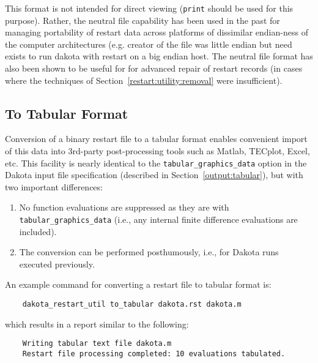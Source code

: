 This format is not intended for direct viewing (\texttt{print} should
be used for this purpose). Rather, the neutral file capability has
been used in the past for managing portability of restart data across
platforms of dissimilar endian-ness of the computer architectures (e.g.
creator of the file was little endian but need exists to run dakota with
restart on a big endian host. The neutral file format has also been
shown to be useful for for advanced repair of restart records
(in cases where the techniques of Section~\ref{restart:utility:removal} 
were insufficient).

\subsection{To Tabular Format}\label{restart:utility:tabular}

Conversion of a binary restart file to a tabular format enables
convenient import of this data into 3rd-party post-processing tools
such as Matlab, TECplot, Excel, etc. This facility is nearly identical
to the \texttt{tabular\_graphics\_data} option in the Dakota input
file specification (described in Section~\ref{output:tabular}), but
with two important differences:
\begin{enumerate}
\item No function evaluations are suppressed as they are with
  \texttt{tabular\_graphics\_data} (i.e., any internal finite
  difference evaluations are included).
\item The conversion can be performed posthumously, i.e., for Dakota
  runs executed previously.
\end{enumerate}

An example command for converting a restart file to tabular format is:
\begin{verbatim}
    dakota_restart_util to_tabular dakota.rst dakota.m
\end{verbatim}
which results in a report similar to the following:
\begin{verbatim}
    Writing tabular text file dakota.m
    Restart file processing completed: 10 evaluations tabulated.
\end{verbatim}

